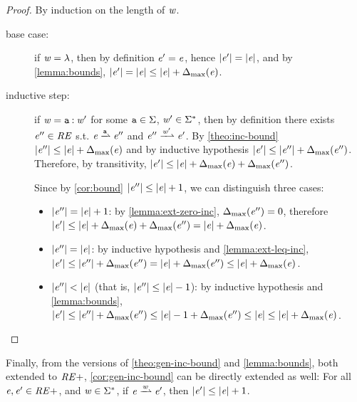 \begin{proof}
 By induction on the length of $\word$.
 \begin{description}
  \item[base case:] if $\word=\emptyWord$, then by definition $\re'=\re$, hence
   $\theight{\re'}=\theight{\re}$, and by \cref{lemma:bounds}, $\theight{\re'}=\theight{\re}\leq\theight{\re}+\incFun{\re}$.

  \item[inductive step:]
   if $\word=\sym\strcons\word'$ for some $\sym\in\symAlph$, $\word'\in\symAlph^*$, then by definition there exists $\re''\in\reSet$ s.t. $\re\parDer{\sym}\re''$ and $\re''\parDer{\word'}\re'$. By \cref{theo:inc-bound} $\theight{\re''}\leq\theight{\re}+\incFun{\re}$ and by inductive hypothesis $\theight{\re'}\leq\theight{\re''}+\incFun{\re''}$. Therefore,
   by transitivity,  $\theight{\re'}\leq\theight{\re}+\incFun{\re}+\incFun{\re''}$.

   Since by \cref{cor:bound} $\theight{\re''}\leq\theight{\re}+1$, we can distinguish three cases:
   \begin{itemize}
    \item $\theight{\re''}=\theight{\re}+1$: by \cref{lemma:ext-zero-inc}, $\incFun{\re''}=0$,
          therefore $\theight{\re'}\leq\theight{\re}+\incFun{\re}+\incFun{\re''}=\theight{\re}+\incFun{\re}$.
    \item $\theight{\re''}=\theight{\re}$: by inductive hypothesis and \cref{lemma:ext-leq-inc},
          $\theight{\re'}\leq\theight{\re''}+\incFun{\re''}=\theight{\re}+\incFun{\re''}\leq\theight{\re}+\incFun{\re}$.
    \item $\theight{\re''}<\theight{\re}$ (that is, $\theight{\re''}\leq\theight{\re}-1$): by inductive hypothesis and \cref{lemma:bounds},
          $\theight{\re'}\leq\theight{\re''}+\incFun{\re''}\leq\theight{\re}-1+\incFun{\re''}\leq\theight{\re}\leq\theight{\re}+\incFun{\re}$.
   \end{itemize}
 \end{description}
\end{proof}

Finally, from the versions of \cref{theo:gen-inc-bound} and \cref{lemma:bounds}, both extended to $\reSetExt$, \cref{cor:gen-inc-bound} can be directly extended as well: For all $\re,\re'\in\reSetExt$, and $\word\in\symAlph^*$, if $\re\parDer{\word}\re'$, then $\theight{\re'}\leq\theight{\re}+1$.